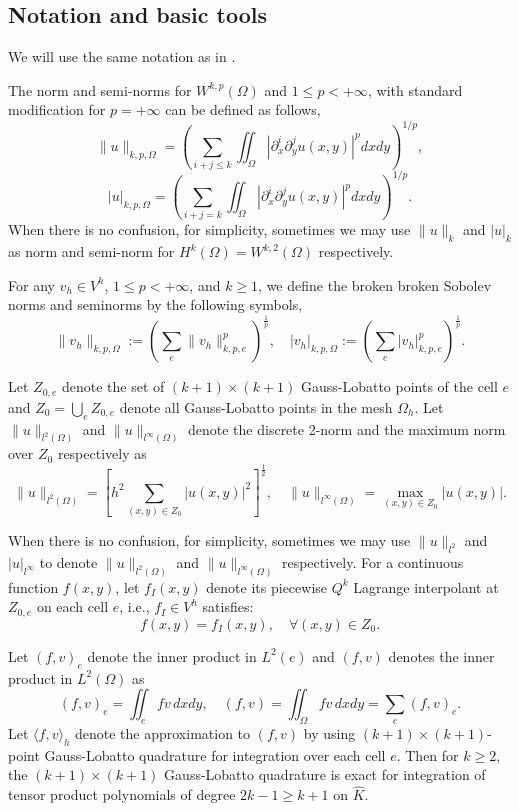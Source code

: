 \documentclass[onefignum,onetabnum]{siamart171218}
\begin{document}
\subsection{Notation and basic tools}
We will use the same  notation  as in \cite{li2020superconvergence1, li2020superconvergence}. 

The norm and semi-norms for $W^{k,p}(\Omega)$ and $1\leq p<+\infty$, with standard modification for $p=+\infty$ can be defined as follows,
$$
 \|u\|_{k,p,\Omega}=\left(\sum\limits_{i+j\leq  k}\iint_{\Omega}|\partial_x^i\partial_y^ju(x,y)|^pdxdy\right)^{1/p},
 $$
$$
 |u|_{k,p,\Omega}=\left(\sum\limits_{i+j= k}\iint_{\Omega}|\partial_x^i\partial_y^ju(x,y)|^pdxdy\right)^{1/p}.
 $$
 When there is no confusion, for simplicity, sometimes we may use $\|u\|_{k}$ and $|u|_{k}$ as norm and semi-norm for $H^k(\Omega)=W^{k,2}(\Omega)$ respectively.

 For any $v_h\in V^h$, $1\leq p<+\infty $, and $k\geq 1$,  we define the broken broken Sobolev norms and seminorms by the following symbols,
  $$\|v_h\|_{k,p,\Omega}:= \left(\sum_e\|v_h\|_{k,p,e}^p\right)^{\frac1p}, \quad 
 |v_h|_{k,p,\Omega}:= \left(\sum_e|v_h|_{k,p,e}^p\right)^{\frac1p}.$$
 
  Let $Z_{0,e}$ denote the set of $(k+1)\times(k+1)$ Gauss-Lobatto points of the cell $e$ and $Z_0=\bigcup_e Z_{0,e}$ denote all Gauss-Lobatto points in the mesh $\Omega_h$. Let $\|u\|_{l^2(\Omega)}$ and $\|u\|_{l^{\infty}(\Omega)}$
denote the discrete 2-norm and the maximum norm over $Z_0$ respectively as 
\[\|u\|_{l^2(\Omega)}=\left[h^2\sum_{(x,y)\in Z_0} |u(x,y)|^2\right]^{\frac12},\quad \|u\|_{l^{\infty}(\Omega)}=\max_{(x,y)\in Z_0} |u(x,y)|.\]
 
  When there is no confusion, for simplicity, sometimes we may use $\|u\|_{l^2}$ and $|u|_{l^{\infty}}$ to denote $\|u\|_{l^2(\Omega)}$ and $\|u\|_{l^{\infty}(\Omega)}$ respectively.
  For a continuous function $f(x,y)$, let $f_I(x,y)$ denote its piecewise $Q^k$ Lagrange interpolant at $Z_{0,e}$ on each cell $e$, i.e., $f_I\in V^h$ satisfies:
\[f(x,y)=f_I(x,y), \quad \forall (x,y)\in Z_0. \]
 
 Let $(f,v)_e$ denote the inner product in  $L^2(e)$ and $(f,v)$ denotes the inner product in $L^2(\Omega)$ as
\[(f,v)_e=\iint_{e} fv\, dxdy,\quad (f,v)=\iint_{\Omega} fv\, dxdy=\sum_e (f,v)_e.\]
 Let  $\langle f,v\rangle_h$ denote the approximation to $(f,v)$ by using $(k+1)\times(k+1)$-point Gauss-Lobatto quadrature for integration over each cell $e$.  Then for $k\geq 2$, the $(k+1)\times(k+1)$ Gauss-Lobatto quadrature is exact for 
integration of  tensor product   polynomials of degree $2k-1\geq k+1$ on $\hat K$.
\end{document}
